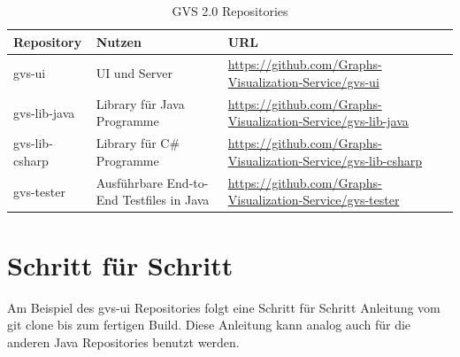 \documentclass[11pt,a4paper,english,oneside]{book}
\numberwithin{equation}{chapter}
\begin{document}
	\begin{table}[h!]
		\centering
		\begin{tabularx}{\linewidth}{l l X}
			\toprule 
			Repository & Nutzen & URL \\
			\midrule
			gvs-ui & UI und Server & \url{https://github.com/Graphs-Visualization-Service/gvs-ui}  \\
			gvs-lib-java & Library für Java Programme & \url{https://github.com/Graphs-Visualization-Service/gvs-lib-java} \\
			gvs-lib-csharp & Library für C\# Programme & \url{https://github.com/Graphs-Visualization-Service/gvs-lib-csharp} \\
			gvs-tester & Ausführbare End-to-End Testfiles in Java & \url{https://github.com/Graphs-Visualization-Service/gvs-tester} \\
			\bottomrule 
		\end{tabularx} 
		\caption{GVS 2.0 Repositories} 
		\label{tbl:repos}
	\end{table}

	\section{Schritt für Schritt}
	Am Beispiel des gvs-ui Repositories folgt eine Schritt für Schritt Anleitung vom git clone bis zum fertigen Build. Diese Anleitung kann analog auch für die anderen Java Repositories benutzt werden.
	
\end{document}
